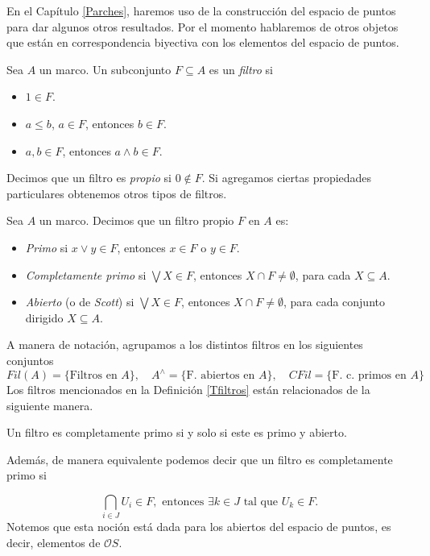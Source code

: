 En el Capítulo \ref{Parches}, haremos uso de la construcción del espacio de puntos para dar algunos otros resultados. Por el momento hablaremos de otros objetos que están en correspondencia biyectiva con los 
elementos del espacio de puntos.

\begin{dfn}\label{Filtro}
    Sea $A$ un marco. Un subconjunto $F\subseteq A$ es un \emph{filtro} si
    \begin{itemize}
        \item $1\in F$.
        \item $a\leq b$, $a\in F$, entonces $b\in F$.
        \item $a, b\in F$, entonces $a\wedge b\in F$.
    \end{itemize}
\end{dfn}
Decimos que un filtro es \emph{propio} si $0\notin F$. Si agregamos ciertas propiedades particulares obtenemos otros tipos de filtros.

\begin{dfn}\label{Tfiltros}
    Sea $A$ un marco. Decimos que un filtro propio $F$ en $A$ es:
    \begin{itemize}
        \item \emph{Primo} si $x\vee y\in F$, entonces $x\in F$ o $y\in F$.
        \item \emph{Completamente primo} si $\bigvee X\in F$, entonces $X\cap F\neq \emptyset$, para cada $X\subseteq A$.
        \item \emph{Abierto} (o de \emph{Scott}) si $\bigvee X\in F$, entonces $X\cap F\neq \emptyset$, para cada  conjunto dirigido $X\subseteq A$.
    \end{itemize}
\end{dfn}

A manera de notación, agrupamos a los distintos filtros en los siguientes conjuntos
\[
Fil(A)=\{\mbox{Filtros en $A$}\}, \quad A^\wedge=\{\mbox{F. abiertos en $A$}\}, \quad CFil=\{\mbox{F. c. primos en $A$}\}
\]
Los filtros mencionados en la Definición \ref{Tfiltros} están relacionados de la siguiente manera. 

\begin{prop}
    Un filtro es completamente primo si y solo si este es primo y abierto.
\end{prop}

Además, de manera equivalente podemos decir que un filtro es completamente primo si

\[
\bigcap_{i\in J} U_i\in F, \mbox{ entonces } \exists k\in J \mbox{ tal que }U_k\in F.
\]
Notemos que esta noción está dada para los abiertos del espacio de puntos, es decir, elementos de $\mathcal{O}S$.\\

